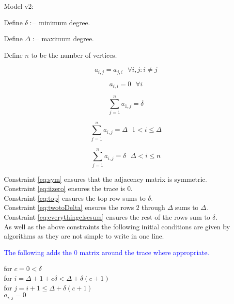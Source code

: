 \documentclass[a4paper]{article}
\begin{document}
\noindent Model v2:

\noindent Define $\delta:=$minimum degree.

\noindent Define $\Delta:=$maximum degree.

\noindent Define $n$ to be the number of vertices.

\begin{equation}
\label{eq:sym}
a_{i,j}=a_{j,i} \text{ } \forall i,j: i\neq j
\end{equation}

\begin{equation}
\label{eq:iizero}
a_{i,i}=0 \text{ } \forall i
\end{equation}

\begin{equation}
\label{eq:top}
\sum_{j=1}^{n}a_{1,j}=\delta
\end{equation}

\begin{equation}
\label{eq:twotoDelta}
\sum_{j=1}^{n}a_{i,j}=\Delta \text{ } 1<i\leq\Delta
\end{equation}

\begin{equation}
\label{eq:everythingelsesum}
\sum_{j=1}^{n}a_{i,j}=\delta \text{ } \Delta<i\leq n
\end{equation}

Constraint \ref{eq:sym} ensures that the adjacency matrix is symmetric.\\

Constraint \ref{eq:iizero} ensures the trace is 0.\\

Constraint \ref{eq:top} ensures the top row sums to $\delta$.\\

Constraint \ref{eq:twotoDelta} ensures the rows 2 through $\Delta$ sums to $\Delta$.\\

Constraint \ref{eq:everythingelsesum} ensures the rest of the rows sum to $\delta$.\\

As well as the above constraints the following initial conditions are given by algorithms as they are not simple to write in one line.

\textcolor{blue}{The following adds the 0 matrix around the trace where appropriate.}

\vspace{0.5em}
for $c=0 < \delta$ \\
\-\hspace{1.5cm}for $i=\Delta+1+c\delta < \Delta+\delta(c+1)$ \\
\-\hspace{3cm}for $j=i+1\leq\Delta+\delta(c+1)$ \\
\-\hspace{4.5cm}$a_{i,j}=0$
\end{document}
